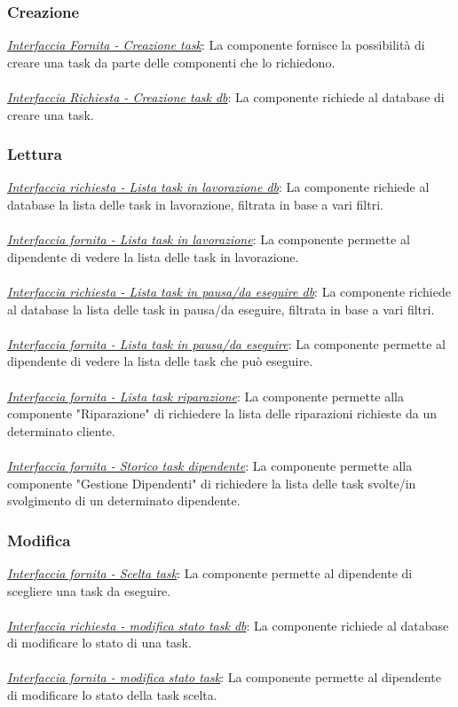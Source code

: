 \documentclass{report}
\begin{document}
\subsubsection*{\indent \indent Creazione}
\uline{\textit{Interfaccia Fornita - Creazione task}}: 
La componente fornisce la possibilità di creare una task da parte delle componenti che lo richiedono. \\\\
\uline{\textit{Interfaccia Richiesta - Creazione task db}}:
La componente richiede al database di creare una task. 
\subsubsection*{\indent \indent Lettura}
\uline{\textit{Interfaccia richiesta - Lista task in lavorazione db}}: 
La componente richiede al database la lista delle task in lavorazione, filtrata in base a vari filtri.\\\\
\uline{\textit{Interfaccia fornita - Lista task in lavorazione}}: 
La componente permette al dipendente di vedere  la lista delle task in lavorazione.\\\\
\uline{\textit{Interfaccia richiesta - Lista task in pausa/da eseguire db}}: 
La componente richiede al database la lista delle task in pausa/da eseguire, filtrata in base a vari filtri.\\\\
\uline{\textit{Interfaccia fornita - Lista task in pausa/da eseguire}}: 
La componente permette al dipendente di vedere la lista delle task che può eseguire.\\\\
\uline{\textit{Interfaccia fornita - Lista task riparazione}}:
La componente permette alla componente "Riparazione" di richiedere la lista delle riparazioni richieste da un determinato cliente.\\\\
\uline{\textit{Interfaccia fornita - Storico task dipendente}}:
La componente permette alla componente "Gestione Dipendenti" di richiedere la lista delle task svolte/in svolgimento di un determinato dipendente.
\subsubsection*{\indent \indent Modifica}
\uline{\textit{Interfaccia fornita - Scelta task}}: 
La componente permette al dipendente di scegliere una task da eseguire.\\\\
\uline{\textit{Interfaccia richiesta - modifica stato task db}}:
 La componente richiede al database di modificare lo stato di una task.\\\\
\uline{\textit{Interfaccia fornita - modifica stato task}}: 
La componente permette al dipendente di modificare lo stato della task scelta.
\end{document}
